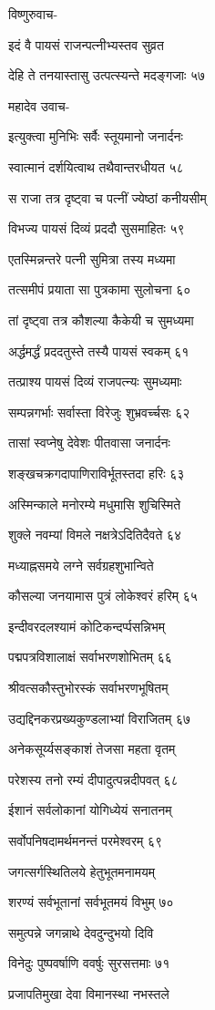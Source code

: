 विष्णुरुवाच-

इदं वै पायसं राजन्पत्नीभ्यस्तव सुव्रत

देहि ते तनयास्तासु उत्पत्स्यन्ते मदङ्गजाः ५७

महादेव उवाच-

इत्युक्त्वा मुनिभिः सर्वैः स्तूयमानो जनार्दनः

स्वात्मानं दर्शयित्वाथ तथैवान्तरधीयत ५८

स राजा तत्र दृष्ट्वा च पत्नीं ज्येष्ठां कनीयसीम्

विभज्य पायसं दिव्यं प्रददौ सुसमाहितः ५९

एतस्मिन्नन्तरे पत्नी सुमित्रा तस्य मध्यमा

तत्समीपं प्रयाता सा पुत्रकामा सुलोचना ६०

तां दृष्ट्वा तत्र कौशल्या कैकेयी च सुमध्यमा

अर्द्धमर्द्धं प्रददतुस्ते तस्यै पायसं स्वकम् ६१

तत्प्राश्य पायसं दिव्यं राजपत्न्यः सुमध्यमाः

सम्पन्नगर्भाः सर्वास्ता विरेजुः शुभ्रवर्च्चसः ६२

तासां स्वप्नेषु देवेशः पीतवासा जनार्दनः

शङ्खचक्रगदापाणिराविर्भूतस्तदा हरिः ६३

अस्मिन्काले मनोरम्ये मधुमासि शुचिस्मिते

शुक्ले नवम्यां विमले नक्षत्रेऽदितिदैवते ६४

मध्याह्नसमये लग्ने सर्वग्रहशुभान्विते

कौसल्या जनयामास पुत्रं लोकेश्वरं हरिम् ६५

इन्दीवरदलश्यामं कोटिकन्दर्प्पसन्निभम्

पद्मपत्रविशालाक्षं सर्वाभरणशोभितम् ६६

श्रीवत्सकौस्तुभोरस्कं सर्वाभरणभूषितम्

उद्यद्दिनकरप्रख्यकुण्डलाभ्यां विराजितम् ६७

अनेकसूर्य्यसङ्काशं तेजसा महता वृतम्

परेशस्य तनो रम्यं दीपादुत्पन्नदीपवत् ६८

ईशानं सर्वलोकानां योगिध्येयं सनातनम्

सर्वोपनिषदामर्थमनन्तं परमेश्वरम् ६९

जगत्सर्गस्थितिलये हेतुभूतमनामयम्

शरण्यं सर्वभूतानां सर्वभूतमयं विभुम् ७०

समुत्पन्ने जगन्नाथे देवदुन्दुभयो दिवि

विनेदुः पुष्पवर्षाणि ववर्षुः सुरसत्तमाः ७१

प्रजापतिमुखा देवा विमानस्था नभस्तले

